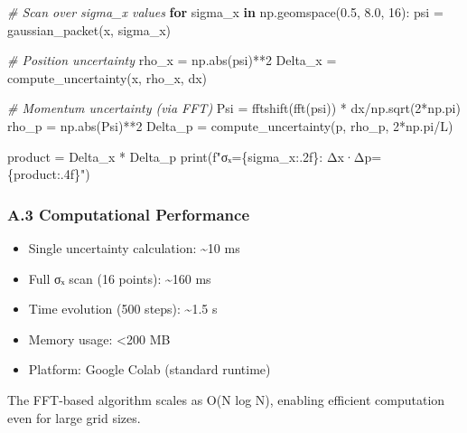 \documentclass[
  11pt,
]{article}
\newenvironment{Shaded}{}{}
\newcommand{\BuiltInTok}[1]{\textcolor[rgb]{0.00,0.50,0.00}{#1}}
\newcommand{\CommentTok}[1]{\textcolor[rgb]{0.38,0.63,0.69}{\textit{#1}}}
\newcommand{\ControlFlowTok}[1]{\textcolor[rgb]{0.00,0.44,0.13}{\textbf{#1}}}
\newcommand{\DecValTok}[1]{\textcolor[rgb]{0.25,0.63,0.44}{#1}}
\newcommand{\FloatTok}[1]{\textcolor[rgb]{0.25,0.63,0.44}{#1}}
\newcommand{\KeywordTok}[1]{\textcolor[rgb]{0.00,0.44,0.13}{\textbf{#1}}}
\newcommand{\NormalTok}[1]{#1}
\newcommand{\OperatorTok}[1]{\textcolor[rgb]{0.40,0.40,0.40}{#1}}
\newcommand{\SpecialCharTok}[1]{\textcolor[rgb]{0.25,0.44,0.63}{#1}}
\newcommand{\SpecialStringTok}[1]{\textcolor[rgb]{0.73,0.40,0.53}{#1}}
\providecommand{\tightlist}{%
  \setlength{\itemsep}{0pt}\setlength{\parskip}{0pt}}
\begin{document}
\begin{Shaded}
\begin{Highlighting}[]
\CommentTok{\# Scan over sigma\_x values}
\ControlFlowTok{for}\NormalTok{ sigma\_x }\KeywordTok{in}\NormalTok{ np.geomspace(}\FloatTok{0.5}\NormalTok{, }\FloatTok{8.0}\NormalTok{, }\DecValTok{16}\NormalTok{):}
\NormalTok{    psi }\OperatorTok{=}\NormalTok{ gaussian\_packet(x, sigma\_x)}
    
    \CommentTok{\# Position uncertainty}
\NormalTok{    rho\_x }\OperatorTok{=}\NormalTok{ np.}\BuiltInTok{abs}\NormalTok{(psi)}\OperatorTok{**}\DecValTok{2}
\NormalTok{    Delta\_x }\OperatorTok{=}\NormalTok{ compute\_uncertainty(x, rho\_x, dx)}
    
    \CommentTok{\# Momentum uncertainty (via FFT)}
\NormalTok{    Psi }\OperatorTok{=}\NormalTok{ fftshift(fft(psi)) }\OperatorTok{*}\NormalTok{ dx}\OperatorTok{/}\NormalTok{np.sqrt(}\DecValTok{2}\OperatorTok{*}\NormalTok{np.pi)}
\NormalTok{    rho\_p }\OperatorTok{=}\NormalTok{ np.}\BuiltInTok{abs}\NormalTok{(Psi)}\OperatorTok{**}\DecValTok{2}
\NormalTok{    Delta\_p }\OperatorTok{=}\NormalTok{ compute\_uncertainty(p, rho\_p, }\DecValTok{2}\OperatorTok{*}\NormalTok{np.pi}\OperatorTok{/}\NormalTok{L)}
    
\NormalTok{    product }\OperatorTok{=}\NormalTok{ Delta\_x }\OperatorTok{*}\NormalTok{ Delta\_p}
    \BuiltInTok{print}\NormalTok{(}\SpecialStringTok{f"σₓ=}\SpecialCharTok{\{}\NormalTok{sigma\_x}\SpecialCharTok{:.2f\}}\SpecialStringTok{: Δx·Δp=}\SpecialCharTok{\{}\NormalTok{product}\SpecialCharTok{:.4f\}}\SpecialStringTok{"}\NormalTok{)}
\end{Highlighting}
\end{Shaded}

\subsubsection{A.3 Computational
Performance}\label{a.3-computational-performance}

\begin{itemize}
\tightlist
\item
  Single uncertainty calculation: \textasciitilde10 ms
\item
  Full σₓ scan (16 points): \textasciitilde160 ms
\item
  Time evolution (500 steps): \textasciitilde1.5 s
\item
  Memory usage: \textless200 MB
\item
  Platform: Google Colab (standard runtime)
\end{itemize}

The FFT-based algorithm scales as O(N log N), enabling efficient
computation even for large grid sizes.
\end{document}

